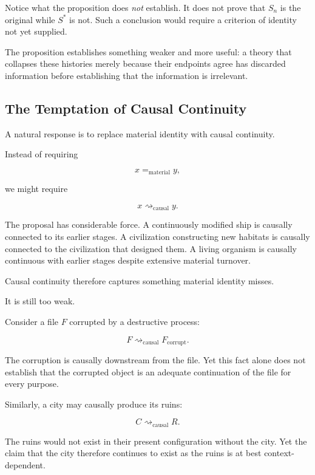 \documentclass[
  11pt,
  a4paper,
  DIV=12,
  BCOR=0mm,
  parskip=half-
]{scrartcl}
\newcommand{\eqmaterial}{=_{\mathrm{material}}}
\newcommand{\leadcausal}{%
  \mathrel{\rightsquigarrow_{\mathrm{causal}}}%
}
\theoremstyle{definition}
\theoremstyle{plain}
\theoremstyle{remark}
\begin{document}
Notice what the proposition does \emph{not} establish. It does not prove that
\(S_n\) is the original while \(S^\ast\) is not. Such a conclusion would
require a criterion of identity not yet supplied.

The proposition establishes something weaker and more useful: a theory that
collapses these histories merely because their endpoints agree has discarded
information before establishing that the information is irrelevant.


\subsection{The Temptation of Causal Continuity}
\label{sec:causal-continuity}

A natural response is to replace material identity with causal continuity.

Instead of requiring

\[
  x\eqmaterial y,
\]

we might require

\[
  x\leadcausal y.
\]

The proposal has considerable force. A continuously modified ship is causally
connected to its earlier stages. A civilization constructing new habitats is
causally connected to the civilization that designed them. A living organism
is causally continuous with earlier stages despite extensive material
turnover.

Causal continuity therefore captures something material identity misses.

It is still too weak.

Consider a file \(F\) corrupted by a destructive process:

\[
  F
  \leadcausal
  F_{\mathrm{corrupt}}.
\]

The corruption is causally downstream from the file. Yet this fact alone does
not establish that the corrupted object is an adequate continuation of the
file for every purpose.

Similarly, a city may causally produce its ruins:

\[
  C
  \leadcausal
  R.
\]

The ruins would not exist in their present configuration without the city.
Yet the claim that the city therefore continues to exist as the ruins is at
best context-dependent.
\end{document}
